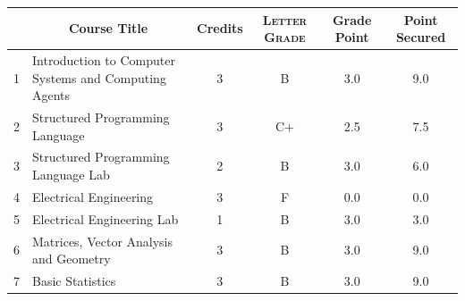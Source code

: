 \documentclass[11pt]{article}
\newcommand*{\numtwo}[1]{\pgfmathprintnumber[
                    fixed, precision=2, fixed zerofill=true]{#1}}
\begin{document}
                \begin{center}
                    \renewcommand{\arraystretch}{1.08}
                    
                \begin{tabular}{|c|l|c|>{\scshape}c|c|c|}
                \hline  \rule[-1ex]{0pt}{3.5ex} {\centering{\bf Course Code}} &  \multicolumn{1}{c|}{\textbf{Course Title}}  & {\bf Credits} & {\bf Letter Grade} & {\bf Grade Point} & {\bf Point Secured}  \\ 
                \hline   1 &  Introduction to Computer Systems and Computing Agents		 & 3 & B & 3.0 & 9.0 \\ %
                \hline   2 &  Structured Programming Language		 & 3 & C+ & 2.5 & 7.5 \\ %
                \hline   3 &  Structured Programming Language Lab		 & 2 & B & 3.0 & 6.0 \\ %
                \hline   4 &  Electrical Engineering		 & 3 & F & 0.0 & 0.0 \\ %
                \hline   5 &  Electrical Engineering Lab		 & 1 & B & 3.0 & 3.0 \\ %
                \hline   6 &  Matrices, Vector Analysis and Geometry		 & 3 & B & 3.0 & 9.0 \\ %
                \hline   7 &  Basic Statistics		 & 3 & B & 3.0 & 9.0 \\ %

\hline                %
                \end{tabular}
                \end{center}
                \renewcommand{\arraystretch}{1.03}
\end{document}
